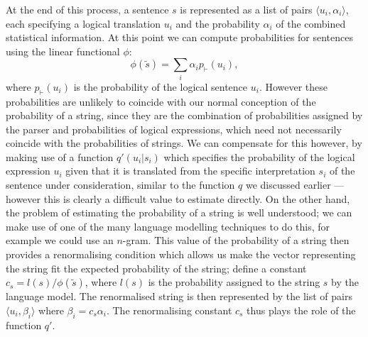 At the end of this process, a sentence $s$ is represented as a list of pairs $\langle u_i, \alpha_i\rangle$, each specifying a logical translation $u_i$ and the probability $\alpha_i$ of the combined statistical information. At this point we can compute probabilities for sentences using the linear functional $\phi$:
$$\phi(\tilde{s}) = \sum_i \alpha_i p_\vdash(u_i),$$
where $p_\vdash(u_i)$ is the probability of the logical sentence $u_i$. However these probabilities are unlikely to coincide with our normal conception of the probability of a string, since they are the combination of probabilities assigned by the parser and probabilities of logical expressions, which need not necessarily coincide with the probabilities of strings. We can compensate for this however, by making use of a function $q'(u_i | s_i)$ which specifies the probability of the logical expression $u_i$ given that it is translated from the specific interpretation $s_i$ of the sentence under consideration, similar to the function $q$ we discussed earlier --- however this is clearly a difficult value to estimate directly. On the other hand, the problem of estimating the probability of a string is well understood; we can make use of one of the many language modelling techniques to do this, for example we could use an $n$-gram. This value of the probability of a string then provides a renormalising condition which allows us make the vector representing the string fit the expected probability of the string; define a constant $c_s = l(s)/\phi(\tilde{s})$, where $l(s)$ is the probability assigned to the string $s$ by the language model. The renormalised string is then represented by the list of pairs $\langle u_i, \beta_i\rangle$ where $\beta_i = c_s\alpha_i$. The renormalising constant $c_s$ thus plays the role of the function $q'$.

